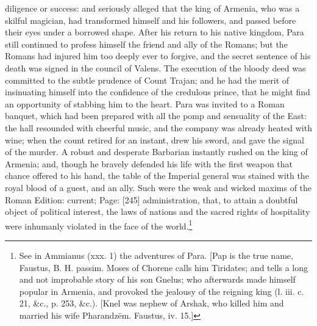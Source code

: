 diligence or success: and seriously alleged that the king of Armenia, who was a skilful magician, had transformed himself and his followers, and passed before their eyes under a borrowed shape. After his return to his native kingdom, Para still continued to profess himself the friend and ally of the Romans; but the Romans had injured him too deeply ever to forgive, and the secret sentence of his death was signed in the council of Valens. The execution of the bloody deed was committed to the subtle prudence of Count Trajan; and he had the merit of insinuating himself into the confidence of the credulous prince, that he might find an opportunity of stabbing him to the heart. Para was invited to a Roman banquet, which had been prepared with all the pomp and sensuality of the East: the hall resounded with cheerful music, and the company was already heated with wine; when the count retired for an instant, drew his sword, and gave the signal of the murder. A robust and desperate Barbarian instantly rushed on the king of Armenia; and, though he bravely defended his life with the first weapon that chance offered to his hand, the table of the Imperial general was stained with the royal blood of a guest, and an ally. Such were the weak and wicked maxims of the Roman Edition: current; Page: [245] administration, that, to attain a doubtful object of political interest, the laws of nations and the sacred rights of hospitality were inhumanly violated in the face of the world.\footnote{See in Ammianus (xxx. 1) the adventures of Para. [Pap is the true name, Faustus, B. H. passim. Moses of Chorene calls him Tiridates; and tells a long and not improbable story of his son Gnelus; who afterwards made himself popular in Armenia, and provoked the jealousy of the reigning king (l. iii. c. 21, \&c., p. 253, \&c.). [Knel was nephew of Arshak, who killed him and married his wife Pharandzēm. Faustus, iv. 15.]}


